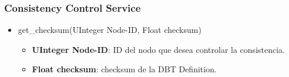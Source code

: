 \subsubsection{Consistency Control Service}

\begin{itemize}
\item get\_checksum(UInteger Node-ID, Float checksum)
  \begin{itemize}
      \item \textbf{UInteger Node-ID}: ID del nodo que desea controlar la
    consistencia.
      \item \textbf{Float checksum}: checksum de la DBT Definition.
  \end{itemize}
\end{itemize}

